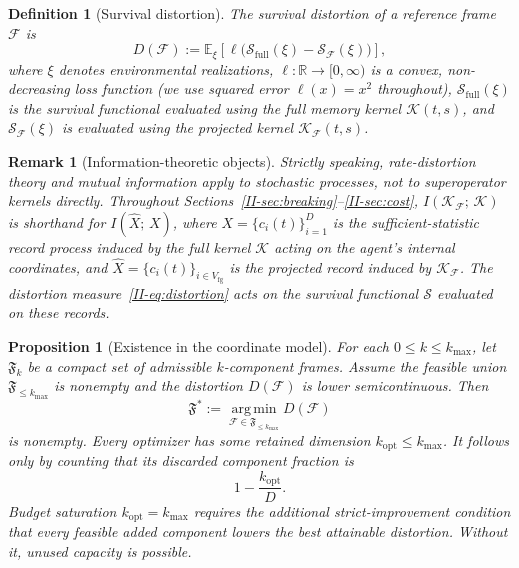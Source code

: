 \documentclass[12pt,a4paper,openany]{book}
\newtheorem{proposition}[theorem]{Proposition}
\newtheorem{definition}[theorem]{Definition}
\newtheorem{remark}[theorem]{Remark}
\begin{document}
\begin{definition}[Survival distortion]
\label{II-def:survival_distortion}
The \emph{survival distortion} of a reference frame
$\mathcal{F}$ is
\begin{equation}
\label{II-eq:distortion}
D(\mathcal{F})
:= \mathbb{E}_{\xi}\!\left[
  \ell\!\bigl(\mathcal{S}_{\mathrm{full}}(\xi)
  - \mathcal{S}_{\mathcal{F}}(\xi)\bigr)
\right],
\end{equation}
where $\xi$ denotes environmental realizations,
$\ell: \mathbb{R} \to [0,\infty)$ is a convex,
non-decreasing loss function (we use squared error
$\ell(x) = x^2$ throughout),
$\mathcal{S}_{\mathrm{full}}(\xi)$ is the survival
functional evaluated using the full memory kernel
$\mathcal{K}(t,s)$, and $\mathcal{S}_{\mathcal{F}}(\xi)$
is evaluated using the projected kernel
$\mathcal{K}_{\mathcal{F}}(t,s)$.
\end{definition}

\begin{remark}[Information-theoretic objects]
\label{II-rem:info_objects}
Strictly speaking, rate-distortion theory and mutual
information apply to stochastic processes, not to
superoperator kernels directly.
Throughout
Sections~\ref{II-sec:breaking}--\ref{II-sec:cost},
$I(\mathcal{K}_{\mathcal{F}};\,\mathcal{K})$ is shorthand
for $I(\hat{X};\,X)$, where
$X = \{c_i(t)\}_{i=1}^{D}$ is the sufficient-statistic
record process induced by the full kernel $\mathcal{K}$
acting on the agent's internal coordinates, and
$\hat{X} = \{c_i(t)\}_{i \in V_{\mathrm{fg}}}$ is the
projected record induced by
$\mathcal{K}_{\mathcal{F}}$.
The distortion measure~\eqref{II-eq:distortion} acts on the
survival functional $\mathcal{S}$ evaluated on these
records.
\end{remark}

\begin{proposition}[Existence in the coordinate model]
\label{II-prop:compression_existence}
For each $0\leq k\leq k_{\max}$, let $\mathfrak F_k$ be a
compact set of admissible $k$-component frames.  Assume the feasible
union $\mathfrak F_{\leq k_{\max}}$ is nonempty and the distortion
$D(\mathcal F)$ is lower semicontinuous.  Then
\begin{equation}
\label{II-eq:k_star}
\mathfrak F^*:=\operatorname*{arg\,min}_{
\mathcal F\in\mathfrak F_{\leq k_{\max}}}D(\mathcal F)
\end{equation}
is nonempty.  Every optimizer has some retained dimension
$k_{\mathrm{opt}}\leq k_{\max}$.  It follows only by counting that its
discarded component fraction is
\begin{equation}
\label{II-eq:discard_fraction}
1-\frac{k_{\mathrm{opt}}}{D}.
\end{equation}
Budget saturation $k_{\mathrm{opt}}=k_{\max}$ requires the additional
strict-improvement condition that every feasible added component lowers
the best attainable distortion.  Without it, unused capacity is
possible.
\end{proposition}
\end{document}
